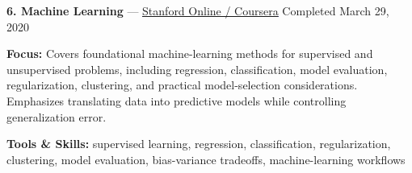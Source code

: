 \documentclass[9pt,letterpaper]{extarticle}
\begin{document}
\vspace{2pt}
\noindent\textbf{6. Machine Learning} {\small --- \textcolor{blue}{\underline{\href{https://www.coursera.org/account/accomplishments/verify/VU3Y5TBLVLZT}{Stanford Online / Coursera}}} \textbar{} Completed \textbar{} March 29, 2020}\par
\textbf{Focus:} Covers foundational machine-learning methods for supervised and unsupervised problems, including regression, classification, model evaluation, regularization, clustering, and practical model-selection considerations. Emphasizes translating data into predictive models while controlling generalization error.\par
{\small\textbf{Tools \& Skills:} supervised learning, regression, classification, regularization, clustering, model evaluation, bias-variance tradeoffs, machine-learning workflows\par}
\vspace{2pt}
\end{document}
